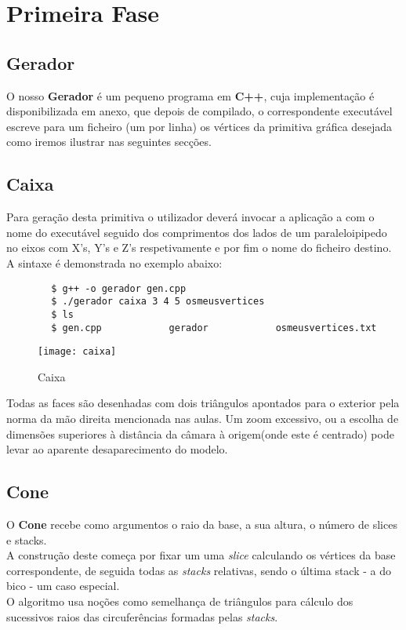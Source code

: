 \documentclass{article}
\begin{document}
\section{Primeira Fase }

\subsection{Gerador}
O nosso \textbf{Gerador} é um pequeno programa em \textbf{C++}, cuja implementação é disponibilizada em anexo, que depois de compilado, o correspondente executável escreve para um ficheiro (um por linha) os vértices da primitiva gráfica desejada  como iremos ilustrar nas seguintes secções.


\subsection{Caixa}
Para geração desta primitiva o utilizador deverá invocar a aplicação a com o nome do executável seguido dos comprimentos dos lados de um paraleloipipedo no eixos com X’s, Y’s e Z’s respetivamente e por fim o nome do ficheiro destino. A sintaxe é demonstrada no exemplo abaixo:

\begin{commandline}
    \begin{verbatim}
        $ g++ -o gerador gen.cpp
        $ ./gerador caixa 3 4 5 osmeusvertices
        $ ls
        $ gen.cpp            gerador            osmeusvertices.txt
    \end{verbatim}
\end{commandline}

\begin{figure}[H]
	\centering
	\texttt{[image: caixa]}
	\caption{Caixa}
\end{figure}

\begin{warn}[Notice:]
Todas as faces são desenhadas com dois triângulos apontados para o exterior pela norma da mão direita mencionada nas aulas. Um zoom excessivo, ou a escolha de dimensões superiores à distância da câmara à origem(onde este é centrado)  pode levar ao aparente desaparecimento do modelo.
\end{warn}

\subsection{Cone}
O \textbf{Cone} recebe como argumentos o raio da base, a sua altura, o número de slices e stacks. \\
A construção deste começa por fixar um uma \textit{slice} calculando os vértices da base correspondente, de seguida todas as \textit{stacks} relativas, sendo o última stack - a do bico - um caso especial. \\
O algoritmo usa noções como semelhança de triângulos para cálculo dos sucessivos raios das circuferências formadas pelas \textit{stacks}.\\
\end{document}
